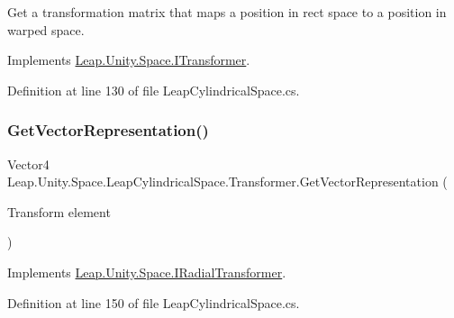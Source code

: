 Get a transformation matrix that maps a position in rect space to a position in warped space. 



Implements \mbox{\hyperlink{interface_leap_1_1_unity_1_1_space_1_1_i_transformer_a151be0f514da2568b75177fdb31724b3}{Leap.\+Unity.\+Space.\+I\+Transformer}}.



Definition at line 130 of file Leap\+Cylindrical\+Space.\+cs.

\mbox{\label{class_leap_1_1_unity_1_1_space_1_1_leap_cylindrical_space_1_1_transformer_a7229a4bf75a299edb189790eeadd9341}} 
\subsubsection{\texorpdfstring{GetVectorRepresentation()}{GetVectorRepresentation()}}
{\footnotesize\ttfamily Vector4 Leap.\+Unity.\+Space.\+Leap\+Cylindrical\+Space.\+Transformer.\+Get\+Vector\+Representation (\begin{DoxyParamCaption}\item[{Transform}]{element }\end{DoxyParamCaption})}



Implements \mbox{\hyperlink{interface_leap_1_1_unity_1_1_space_1_1_i_radial_transformer_af08c4933956ae199215c193458086c66}{Leap.\+Unity.\+Space.\+I\+Radial\+Transformer}}.



Definition at line 150 of file Leap\+Cylindrical\+Space.\+cs.

\mbox{\label{class_leap_1_1_unity_1_1_space_1_1_leap_cylindrical_space_1_1_transformer_ab494977cfba432d2af0103dbe9a004dd}} 
